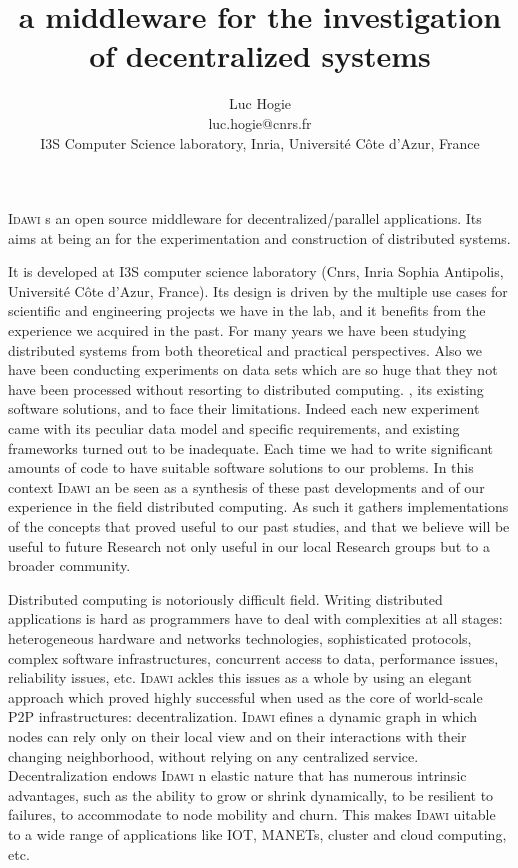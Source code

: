 \documentclass{article}
\title{\idawi a middleware for the investigation of decentralized systems}
\author{Luc Hogie \\ luc.hogie@cnrs.fr \\
I3S Computer Science laboratory, Inria, Universit\'e C\^ote d'Azur, France}
\newcommand{\idawi}[1]{\textsc{Idawi}\xspace}
\begin{document}
\maketitle

\idawi is an open source middleware for decentralized/parallel applications. 
Its aims at being an  for the experimentation and construction of distributed systems.

It is developed at I3S computer science laboratory (Cnrs, Inria Sophia Antipolis, Université Côte d'Azur, France).
Its design is driven by the multiple use cases for scientific and engineering projects we have in the lab, and it benefits from the experience we acquired in the past. For many years we have been studying distributed systems from both theoretical and practical perspectives. Also we have been conducting experiments on data sets which are so huge that they not have been processed without resorting to distributed computing. , its existing software solutions, and to face their limitations. Indeed each new experiment came with its peculiar data model and specific requirements, and existing frameworks turned out to be inadequate. Each time we had to write significant amounts of code to have suitable software solutions to our problems.
In this context \idawi can be seen as a synthesis of these past developments and of our experience in the field distributed computing. As such it gathers implementations of the concepts that proved useful to our past studies, and that we believe will be useful to future Research not only useful in our local Research groups but to a broader community.

Distributed computing is notoriously difficult field. Writing distributed applications is hard as programmers have to deal with complexities at all stages: heterogeneous hardware and networks technologies, sophisticated protocols, complex software infrastructures, concurrent access to data, performance issues, reliability issues, etc.
\idawi tackles this issues as a whole by using an elegant approach which proved highly successful when used as the core of world-scale P2P infrastructures: decentralization. \idawi defines a dynamic graph  in which nodes can rely only on their local view and on their interactions with their changing neighborhood, without relying on any centralized service. Decentralization endows \idawi an elastic nature that has numerous intrinsic advantages, such as the ability to grow or shrink dynamically, to be resilient to failures, to accommodate to node mobility and churn.
This  makes \idawi suitable to a wide range of applications like IOT, MANETs, cluster and cloud computing, etc.
\end{document}

